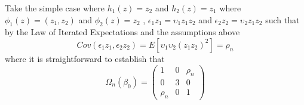 \documentclass[11pt, fleqn]{article}
\begin{document}
Take the simple case where $h_1(z)=z_2$ and $h_2(z)=z_1$ where  $\phi_1(z)=(z_1,z_2)$ and $\phi_2(z)=z_2$ , $\epsilon_1z_1=\upsilon_1z_1z_2$  and $\epsilon_2 z_2=\upsilon_2 z_1z_2$ such that by the Law of Iterated Expectations  and the assumptions above
\begin{equation}Cov(\epsilon_1z_1,\epsilon_2z_2)=E[\upsilon_1\upsilon_2(z_1z_2)^2]=\rho_n\end{equation} 
where it is straightforward to establish that 
\begin{equation} \Omega_n(\beta_0)=\left(\begin{array}{ccc} 1 & 0 & \rho_n \\ 0 & 3& 0\\ \rho_n& 0 & 1 \end{array}\right) \end{equation}
\end{document}
